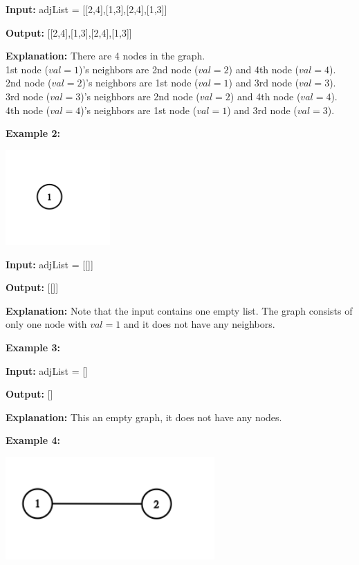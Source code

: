 \documentclass[a4paper]{article}
\begin{document}
\textbf{Input:} adjList = [[2,4],[1,3],[2,4],[1,3]]

\textbf{Output:} [[2,4],[1,3],[2,4],[1,3]]

\textbf{Explanation:} There are 4 nodes in the graph.\\
1st node ($val = 1$)'s neighbors are 2nd node ($val = 2$) and 4th node ($val = 4$).\\
2nd node ($val = 2$)'s neighbors are 1st node ($val = 1$) and 3rd node ($val = 3$).\\
3rd node ($val = 3$)'s neighbors are 2nd node ($val = 2$) and 4th node ($val = 4$).\\
4th node ($val = 4$)'s neighbors are 1st node ($val = 1$) and 3rd node ($val = 3$).


\SPACE


\textbf{Example 2:}
\begin{center}
\includegraphics[width=4cm]{images/2.png}
\end{center}

\textbf{Input:} adjList = [[]]

\textbf{Output:} [[]]

\textbf{Explanation:} Note that the input contains one empty list. The graph consists of only one node with $val = 1$ and it does not have any neighbors.


\SPACE


\textbf{Example 3:}

\textbf{Input:} adjList = []

\textbf{Output:} []

\textbf{Explanation:} This an empty graph, it does not have any nodes.


\SPACE

\textbf{Example 4:}
\begin{center}
\includegraphics[width=8cm]{images/3.png}
\end{center}
\end{document}

